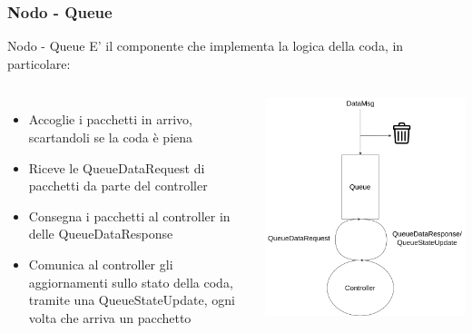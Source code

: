 \documentclass[compress]{beamer}
\begin{document}
\subsubsection*{Nodo - Queue}
\begin{frame}{Nodo - Queue}
    E' il componente che implementa la logica della coda, in particolare:
    \vspace{0.5cm}
        \begin{columns}
                \begin{minipage}[b]{1\textwidth}
                    \begin{itemize}
                        \item Accoglie i pacchetti in arrivo, scartandoli se la coda è piena
                        \item Riceve le QueueDataRequest di pacchetti da parte del controller
                        \item Consegna i pacchetti al controller in delle QueueDataResponse
                        \item Comunica al controller gli aggiornamenti sullo stato della coda, tramite una QueueStateUpdate, ogni volta che arriva un pacchetto
                    \end{itemize}
                \end{minipage}
                \begin{minipage}{.9\textwidth}
                    \begin{adjustbox}{margin=0.5cm 0cm 0.1cm 0cm, center} %
                        \includegraphics[width=1\textwidth]{figs/queue_scheme.png}
                    \end{adjustbox}
                \end{minipage}
        \end{columns}
\end{frame}
\end{document}

